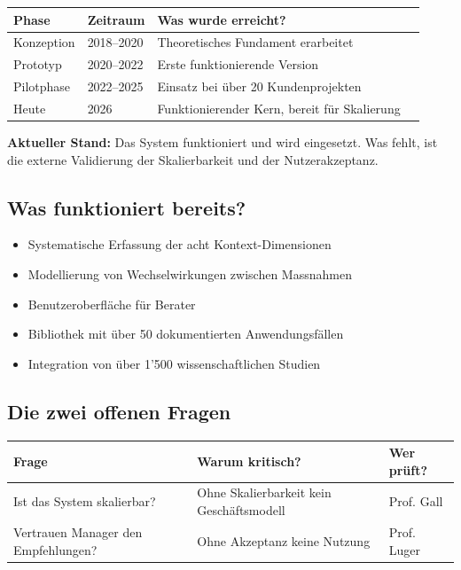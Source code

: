 \documentclass[11pt,a4paper]{article}
\begin{document}
\begin{table}[h]
\centering
\begin{tabular}{llll}
\toprule
\textbf{Phase} & \textbf{Zeitraum} & \textbf{Was wurde erreicht?} \\
\midrule
Konzeption & 2018--2020 & Theoretisches Fundament erarbeitet \\
Prototyp & 2020--2022 & Erste funktionierende Version \\
Pilotphase & 2022--2025 & Einsatz bei über 20 Kundenprojekten \\
Heute & 2026 & Funktionierender Kern, bereit für Skalierung \\
\bottomrule
\end{tabular}
\end{table}

\begin{insightbox}
\textbf{Aktueller Stand:} Das System funktioniert und wird eingesetzt. Was fehlt, ist die externe Validierung der Skalierbarkeit und der Nutzerakzeptanz.
\end{insightbox}

\subsection{Was funktioniert bereits?}

\begin{itemize}
    \item[\checkmark] Systematische Erfassung der acht Kontext-Dimensionen
    \item[\checkmark] Modellierung von Wechselwirkungen zwischen Massnahmen
    \item[\checkmark] Benutzeroberfläche für Berater
    \item[\checkmark] Bibliothek mit über 50 dokumentierten Anwendungsfällen
    \item[\checkmark] Integration von über 1'500 wissenschaftlichen Studien
\end{itemize}

\subsection{Die zwei offenen Fragen}

\begin{table}[h]
\centering
\begin{tabularx}{\textwidth}{lXl}
\toprule
\textbf{Frage} & \textbf{Warum kritisch?} & \textbf{Wer prüft?} \\
\midrule
Ist das System skalierbar? & Ohne Skalierbarkeit kein Geschäftsmodell & Prof. Gall \\
Vertrauen Manager den Empfehlungen? & Ohne Akzeptanz keine Nutzung & Prof. Luger \\
\bottomrule
\end{tabularx}
\end{table}
\end{document}
